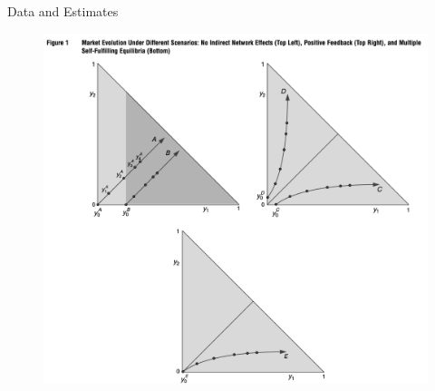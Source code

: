 \documentclass[aspectratio=169,11pt]{beamer}
\begin{document}
\begin{frame}{Data and Estimates}
\begin{figure}
\centering
\includegraphics[height=0.9\textheight]{resources/triangles.png}
\end{figure}
\end{frame}
\end{document}
